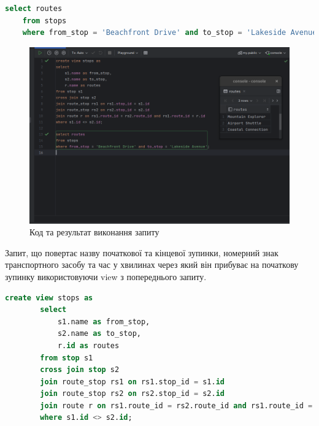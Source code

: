 \documentclass[14pt]{extreport}
\begin{document}
\begin{normalsize}
\begin{lstlisting}[language=sql]
	select routes
	from stops
	where from_stop = 'Beachfront Drive' and to_stop = 'Lakeside Avenue';
	\end{lstlisting}
	\fi
	\begin{figure}[H]
		\centering
		\includegraphics[scale=0.5]{3}
		\caption{Код та результат виконання запиту}
	\end{figure}
	\pagebreak
	Запит, що повертає назву початкової та кінцевої зупинки, номерний знак транспортного засобу та час у хвилинах через який він прибуває на початкову зупинку використовуючи view з попереднього запиту.
	
	\iffalse
	\begin{lstlisting}[language=sql]
		create view stops as
		select
			s1.name as from_stop,
			s2.name as to_stop,
			r.id as routes
		from stop s1
		cross join stop s2
		join route_stop rs1 on rs1.stop_id = s1.id
		join route_stop rs2 on rs2.stop_id = s2.id
		join route r on rs1.route_id = rs2.route_id and rs1.route_id = r.id
		where s1.id <> s2.id;
		

\end{lstlisting}
\end{normalsize}
\end{document}
